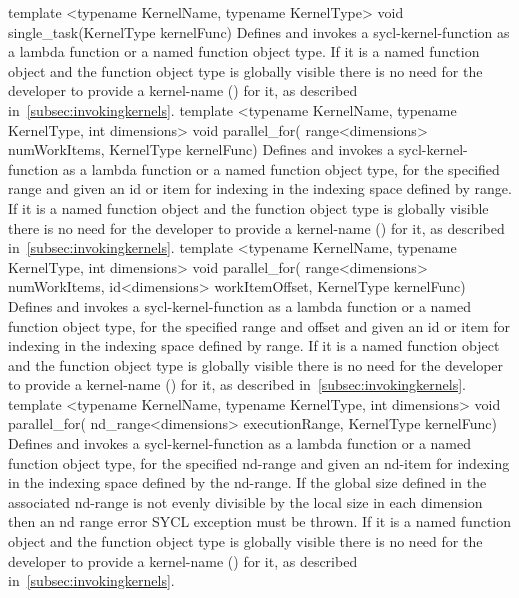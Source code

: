    \addRowTwoL
    {template <typename KernelName, typename KernelType>}
    {void single_task(KernelType kernelFunc)}
    {
      Defines and invokes a \gls{sycl-kernel-function} as a lambda function
      or a named function object type.
      If it is a named function object and the function object type is globally
      visible there is no need for the developer
      to provide a \gls{kernel-name} () for it,
      as described in~\ref{subsec:invokingkernels}.
    }
   \addRowThreeL
    {template <typename KernelName, typename KernelType, int dimensions>}
    {void parallel_for(}
    {range<dimensions> numWorkItems, KernelType kernelFunc)}
    {
      Defines and invokes a \gls{sycl-kernel-function} as a lambda function
      or a named function object type,
      for the specified range and given an id or item for indexing in the
      indexing space defined by range.
      If it is a named function object and the function object type is globally
      visible there is no need for the developer
      to provide a \gls{kernel-name} () for it,
      as described in~\ref{subsec:invokingkernels}.
    }
    \addRowFourL
    {template <typename KernelName, typename KernelType, int dimensions>}
    {void parallel_for(}
    { range<dimensions> numWorkItems,}
    { id<dimensions> workItemOffset, KernelType kernelFunc)}
    {
      Defines and invokes a \gls{sycl-kernel-function} as a lambda function
      or a named function object type,
      for the specified range and offset and given an id or item for indexing in
      the indexing space defined by range.
      If it is a named function object and the function object type is globally
      visible there is no need for the developer
      to provide a \gls{kernel-name} () for it,
      as described in~\ref{subsec:invokingkernels}.
    }
  \addRowThreeL
    {template <typename KernelName, typename KernelType, int dimensions>}
    {void parallel_for(}
    {nd_range<dimensions> executionRange, KernelType kernelFunc)}
    {
      Defines and invokes a \gls{sycl-kernel-function} as a lambda function
      or a named function object type,
      for the specified \gls{nd-range} and given an \gls{nd-item}
      for indexing in the indexing space defined by the \gls{nd-range}. If the
      global size defined in the associated nd-range is not evenly divisible
      by the local size in each dimension then an nd range error SYCL exception
      must be thrown.
      If it is a named function object and the function object type is globally
      visible there is no need for the developer
      to provide a \gls{kernel-name} () for it,
      as described in~\ref{subsec:invokingkernels}.
    }
